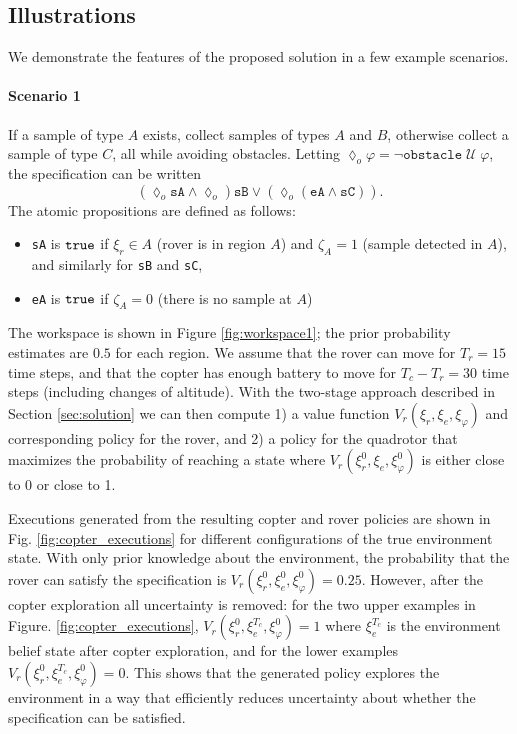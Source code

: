 \documentclass[conference]{IEEEtran}
\begin{document}
\subsection{Illustrations}

We demonstrate the features of the proposed solution in a few example scenarios.

\paragraph{Scenario 1} If a sample of type $A$ exists, collect samples of types $A$ and $B$, otherwise collect a sample of type $C$, all while avoiding obstacles. Letting $\lozenge_o \varphi = \lnot \texttt{obstacle} \; \mathcal U \; \varphi$, the specification can be written
\begin{equation*}
  \left( \lozenge_o \texttt{sA} \land \lozenge_o \right) \texttt{sB} \lor \left( \lozenge_o ( \texttt{eA} \land \texttt{sC} ) \right).
\end{equation*}
The atomic propositions are defined as follows:
\begin{itemize}
	\item \texttt{sA} is $\texttt{true}$ if $\xi_r \in A$ (rover is in region $A$) and $\zeta_A = 1$ (sample detected in $A$), and similarly for \texttt{sB} and \texttt{sC},
	\item \texttt{eA} is $\texttt{true}$ if $\zeta_A = 0$ (there is no sample at $A$)
\end{itemize}
The workspace is shown in Figure \ref{fig:workspace1}; the prior probability estimates are $0.5$ for each region. We assume that the rover can move for $T_r = 15$ time steps, and that the copter has enough battery to move for $T_c - T_r = 30$ time steps (including changes of altitude). With the two-stage approach described in Section \ref{sec:solution} we can then compute 1) a value function $V_r(\xi_r, \xi_e, \xi_\varphi)$ and corresponding policy for the rover, and 2) a policy for the quadrotor that maximizes the probability of reaching a state where $V_r(\xi_r^0, \xi_e, \xi_\varphi^0)$ is either close to 0 or close to 1.

Executions generated from the resulting copter and rover policies are shown in Fig. \ref{fig:copter_executions} for different configurations of the true environment state. With only prior knowledge about the environment, the probability that the rover can satisfy the specification is $V_r(\xi_r^0, \xi_e^0, \xi_\varphi^0) = 0.25$. However, after the copter exploration all uncertainty is removed: for the two upper examples in Figure. \ref{fig:copter_executions}, $V_r(\xi_r^0, \xi_e^{T_{c}}, \xi_\varphi^0) = 1$ where $\xi_e^{T_c}$ is the environment belief state after copter exploration, and for the lower examples $V_r(\xi_r^0, \xi_e^{T_{c}}, \xi_\varphi^0) = 0$. This shows that the generated policy explores the environment in a way that efficiently reduces uncertainty about whether the specification can be satisfied.
\end{document}
